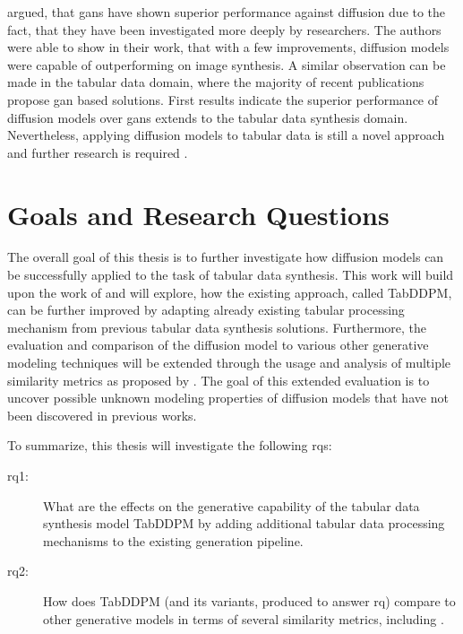 \cite{dhariwal2021DiffusionModelsBeat} argued, that \glspl{gan} have shown superior performance against diffusion due to the fact, that they have been investigated more deeply by researchers.
The authors were able to show in their work, that with a few improvements, diffusion models were capable of outperforming  on image synthesis.
A similar observation can be made in the tabular data domain, where the majority of recent publications propose \gls{gan} based solutions.
First results \cite{kotelnikov2022TabDDPMModellingTabular} indicate the superior performance of diffusion models over \glspl{gan} extends to the tabular data synthesis domain.
Nevertheless, applying diffusion models to tabular data is still a novel approach and further research is required \cite{borisov2022DeepNeuralNetworks}.

 
\section{Goals and Research Questions}
\label{ch:intro-goals}
The overall goal of this thesis is to further investigate how diffusion models can be successfully applied to the task of tabular data synthesis.
This work will build upon the work of \cite{kotelnikov2022TabDDPMModellingTabular} and will explore, how the existing approach, called TabDDPM, can be further improved by adapting 
already existing tabular processing mechanism from previous tabular data synthesis solutions.
Furthermore, the evaluation and comparison of the diffusion model to various other generative modeling techniques will be extended through the usage and analysis
of multiple similarity metrics as proposed by \cite{chundawat2022UniversalMetricRobust}.
The goal of this extended evaluation is to uncover possible unknown modeling properties of diffusion models that have not been discovered in previous works.

To summarize, this thesis will investigate the following \glspl{rq}:

\begin{description}
    \item[\gls{rq}1:] What are the effects on the generative capability of the tabular data synthesis model TabDDPM by adding additional tabular data processing mechanisms to the existing generation pipeline.
    \item[\gls{rq}2:] How does TabDDPM (and its variants, produced to answer \gls{rq}) compare to other generative models in terms of several similarity metrics, including \cite{chundawat2022UniversalMetricRobust}.
\end{description}

